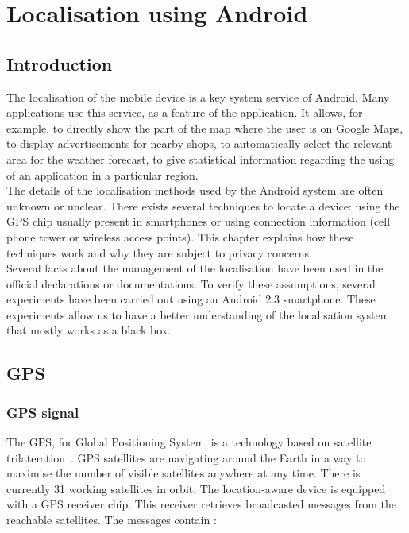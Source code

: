 \chapter{Localisation using Android}
\label{chap:and-loc}

\section*{Introduction}
The localisation of the mobile device is a key system service of Android.
Many applications use this service, as a feature of the application.%
It allows, for example, to directly show the part of the map where the user is on Google Maps, to display advertisements for nearby shops, to automatically select the relevant area for the weather forecast, to give statistical information regarding the using of an application in a particular region.\\

The details of the localisation methods used by the Android system are often unknown or unclear.
There exists several techniques to locate a device: using the GPS chip usually present in smartphones or using connection information (cell phone tower or wireless access points).
This chapter explains how these techniques work and why they are subject to privacy concerns.\\

Several facts about the management of the localisation have been used in the official declarations or documentations.
To verify these assumptions, several experiments have been carried out using an Android 2.3 smartphone.
These experiments allow us to have a better understanding of the localisation system that mostly works as a black box.


\section{GPS}
\label{sec:loc-gps}


\subsection{GPS signal}

The GPS, for Global Positioning System, is a technology based on satellite trilateration~\cite{pocketgpsworld}.
GPS satellites are navigating around the Earth in a way to maximise the number of visible satellites anywhere at any time.
There is currently 31 working satellites in orbit.
The location-aware device is equipped with a GPS receiver chip.
This receiver retrieves broadcasted messages from the reachable satellites.
The messages contain :

